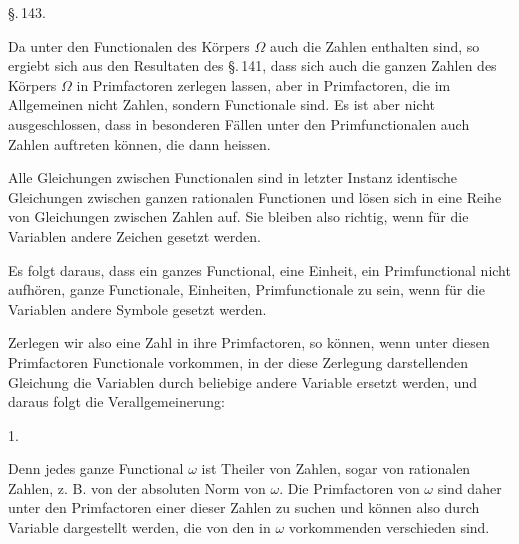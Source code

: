 

\begin{center}
\S.\,143.

\end{center}

Da unter den Functionalen des K\"orpers $\Omega$ auch die Zahlen enthalten sind, so ergiebt sich aus den Resultaten des \S.\,141, dass sich auch die ganzen Zahlen des K\"orpers $\Omega$ in Primfactoren zerlegen lassen, aber in Primfactoren, die im Allgemeinen nicht Zahlen, sondern Functionale sind. Es ist aber nicht ausgeschlossen, dass in besonderen F\"allen unter den Primfunctionalen auch Zahlen auftreten k\"onnen, die dann  heissen.

Alle Gleichungen zwischen Functionalen sind in letzter Instanz identische Gleichungen zwischen ganzen rationalen Functionen und l\"osen sich in eine Reihe von Gleichungen zwischen Zahlen auf. Sie bleiben also richtig, wenn f\"ur die Variablen andere Zeichen gesetzt werden.

Es folgt daraus, dass ein ganzes Functional, eine Einheit, ein Primfunctional nicht aufh\"oren, ganze Functionale, Einheiten, Primfunctionale zu sein, wenn f\"ur die Variablen andere Symbole gesetzt werden.

Zerlegen wir also eine Zahl in ihre Primfactoren, so k\"onnen, wenn unter diesen Primfactoren Functionale vorkommen, in der diese Zerlegung darstellenden Gleichung die Variablen durch beliebige andere Variable ersetzt werden, und daraus folgt die Verallgemeinerung:

1. 

Denn jedes ganze Functional $\omega$ ist Theiler von Zahlen, sogar von rationalen Zahlen, z. B. von der absoluten Norm von $\omega$. Die Primfactoren von $\omega$ sind daher unter den Primfactoren einer dieser Zahlen zu suchen und k\"onnen also durch Variable dargestellt werden, die von den in $\omega$ vorkommenden verschieden sind.
